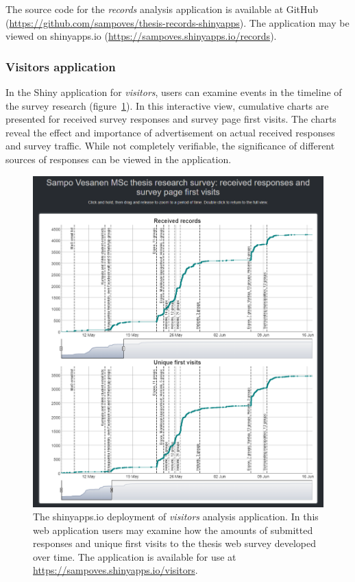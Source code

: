 The source code for the \textit{records} analysis application is available at GitHub (\textcolor{blue}{\url{https://github.com/sampoves/thesis-records-shinyapps}}). The application may be viewed on shinyapps.io (\textcolor{blue}{\url{https://sampoves.shinyapps.io/records}}).

\subsubsection{Visitors application}

In the Shiny application for \textit{visitors}, users can examine events in the timeline of the survey research (figure~\ref{fig:shinyapps_visitors}). In this interactive view, cumulative charts are presented for received survey responses and survey page first visits. The charts reveal the effect and importance of advertisement on actual received responses and survey traffic. While not completely verifiable, the significance of different sources of responses can be viewed in the application.

\begin{figure}[H]%
    \centering
    \includegraphics[width=.75\textwidth]{images/shinyapps_visitors.png}
    \caption[Visitors analysis application screen capture]{The shinyapps.io deployment of \textit{visitors} analysis application. In this web application users may examine how the amounts of submitted responses and unique first visits to the thesis web survey developed over time. The application is available for use at \textcolor{blue}{\url{https://sampoves.shinyapps.io/visitors}}.}%
    \label{fig:shinyapps_visitors}%
\end{figure}

